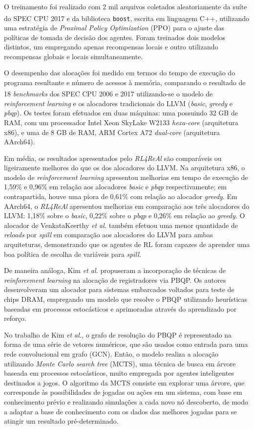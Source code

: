 \documentclass[
	12pt,				%
	openright,			%
	twoside,			%
	a4paper,			%
	tcc,			%
	]{ABNT-DC-UEL}
\begin{document}
O treinamento foi realizado com 2 mil arquivos coletados aleatoriamente da suíte do SPEC CPU\textsuperscript{\textregistered} 2017 e da biblioteca \texttt{boost}, escrita em linguagem C++, utilizando uma estratégia de \textit{Proximal Policy Optimization} (PPO) para o ajuste das políticas de tomada de decisão dos agentes. Foram treinados dois modelos distintos, um empregando apenas recompensas locais e outro utilizando recompensas globais e locais simultaneamente.

O desempenho das alocações foi medido em termos do tempo de execução do programa resultante e número de acessos à memória, comparando o resultado de 18 \textit{benchmarks} dos SPEC CPU\textsuperscript{\textregistered} 2006 e 2017 utilizando-se o modelo de \textit{reinforcement learning} e os alocadores tradicionais do LLVM (\textit{basic}, \textit{greedy} e \textit{pbqp}). Os testes foram efetuados em duas máquinas: uma possuindo 32 GB de RAM, com um processador Intel Xeon SkyLake W2133 \textit{hexa-core} (arquitetura x86), e uma de 8 GB de RAM, ARM Cortex A72 \textit{dual-core} (arquitetura AArch64).

Em média, os resultados apresentados pelo \textit{RL4ReAl} são comparáveis ou ligeiramente melhores do que os dos alocadores do LLVM. Na arquitetura x86, o modelo de \textit{reinforcement learning} apresentou melhorias em tempo de execução de 1,59\% e 0,96\% em relação aos alocadores \textit{basic} e \textit{pbqp} respectivamente; em contrapartida, houve uma piora de 0,61\% com relação ao alocador \textit{greedy}. Em AArch64, o \textit{RL4ReAl} apresentou melhorias em comparação aos três alocadores do LLVM: 1,18\% sobre o \textit{basic}, 0,22\% sobre o \textit{pbqp} e 0,26\% em relação ao \textit{greedy}. O alocador de VenkataKeerthy \textit{et al.} também efetuou uma menor quantidade de \textit{reloads} por \textit{spill} em comparação aos alocadores do LLVM para ambas arquiteturas, demonstrando que os agentes de RL foram capazes de aprender uma boa política de escolha de variáveis para \textit{spill}.

De maneira análoga, Kim \textit{et al.} \cite{kim:22} propuseram a incorporação de técnicas de \textit{reinforcement learning} na alocação de registradores via PBQP. Os autores desenvolveram um alocador para sistemas embarcados voltados para teste de chips DRAM, empregando um modelo que resolve o PBQP utilizando heurísticas baseadas em processos estocásticos e aprimoradas através do aprendizado por reforço.

No trabalho de Kim \textit{et al.}, o grafo de resolução do PBQP é representado na forma de uma série de vetores numéricos, que são usados como entrada para uma rede convolucional em grafo (GCN). Então, o modelo realiza a alocação utilizando \textit{Monte Carlo search tree} (MCTS), uma técnica de busca em árvore baseada em processos estocásticos, muito empregada por agentes inteligentes destinados a jogos. O algoritmo da MCTS consiste em explorar uma árvore, que corresponde às possibilidades de jogadas ou ações em um sistema, com base em conhecimento prévio e realizando simulações a cada novo nó descoberto, de modo a adaptar a base de conhecimento com os dados das melhores jogadas para se atingir um resultado pré-determinado.
\end{document}

